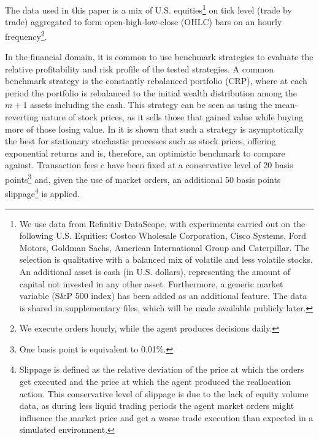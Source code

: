 \documentclass{article}
\begin{document}
The data used in this paper is a mix of U.S. equities\footnote{We use data from Refinitiv DataScope, with experiments carried out on the following U.S. Equities: Costco Wholesale Corporation, Cisco Systems, Ford Motors, Goldman Sachs, American International Group and Caterpillar. The selection is qualitative with a balanced mix of volatile and less volatile stocks. An additional asset is cash (in U.S. dollars), representing the amount of capital not invested in any other asset. Furthermore, a generic market variable (S\&P 500 index) has been added as an additional feature. The data is shared in supplementary files, which will be made available publicly later.} on tick level (trade by trade) aggregated to form open-high-low-close (OHLC) bars on an hourly frequency\footnote{We execute orders hourly, while the agent produces decisions daily.}.

In the financial domain, it is common to use benchmark strategies to evaluate the relative profitability and risk profile of the tested strategies. A common benchmark strategy is the constantly rebalanced portfolio (CRP), where at each period the portfolio is rebalanced to the initial wealth distribution among the $m+1$ assets including the cash. This strategy can be seen as using the mean-reverting nature of stock prices, as it sells those that gained value while buying more of those losing value. In \cite{cover91} it is shown that such a strategy is asymptotically the best for stationary stochastic processes such as stock prices, offering exponential returns and is, therefore, an optimistic benchmark to compare against. Transaction fees $c$ have been fixed at a conservative level of 20 basis points\footnote{One basis point is equivalent to 0.01\%.} and, given the use of market orders, an additional 50 basis points slippage\footnote{Slippage is defined as the relative deviation of the price at which the orders get executed and the price at which the agent produced the reallocation action. This conservative level of slippage is due to the lack of equity volume data, as during less liquid trading periods the agent market orders might influence the market price and get a worse trade execution than expected in a simulated environment.} is applied.

\end{document}
